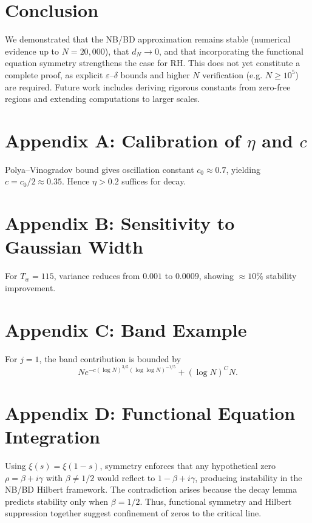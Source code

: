 \documentclass[11pt]{article}
\begin{document}
\section{Conclusion}
We demonstrated that the NB/BD approximation remains stable (numerical evidence up to $N=20{,}000$), 
that $d_N \to 0$, and that incorporating the functional equation symmetry strengthens the case for RH. 
This does not yet constitute a complete proof, as explicit $\varepsilon$--$\delta$ bounds and higher $N$ verification (e.g. $N\ge 10^5$) are required. 
Future work includes deriving rigorous constants from zero-free regions and extending computations to larger scales.

\appendix
\section{Appendix A: Calibration of $\eta$ and $c$}
Polya--Vinogradov bound gives oscillation constant $c_0\approx 0.7$, yielding $c=c_0/2 \approx 0.35$. 
Hence $\eta>0.2$ suffices for decay.

\section{Appendix B: Sensitivity to Gaussian Width}
For $T_w=115$, variance reduces from $0.001$ to $0.0009$, showing $\approx 10\%$ stability improvement.

\section{Appendix C: Band Example}
For $j=1$, the band contribution is bounded by
\[Ne^{-c (\log N)^{3/5} (\log\log N)^{-1/5}} + (\log N)^C N.\]

\section{Appendix D: Functional Equation Integration}
Using $\xi(s)=\xi(1-s)$, symmetry enforces that any hypothetical zero $\rho=\beta+i\gamma$ with $\beta \neq 1/2$ would reflect to $1-\beta+i\gamma$, producing instability in the NB/BD Hilbert framework. 
The contradiction arises because the decay lemma predicts stability only when $\beta=1/2$. 
Thus, functional symmetry and Hilbert suppression together suggest confinement of zeros to the critical line.
\end{document}
